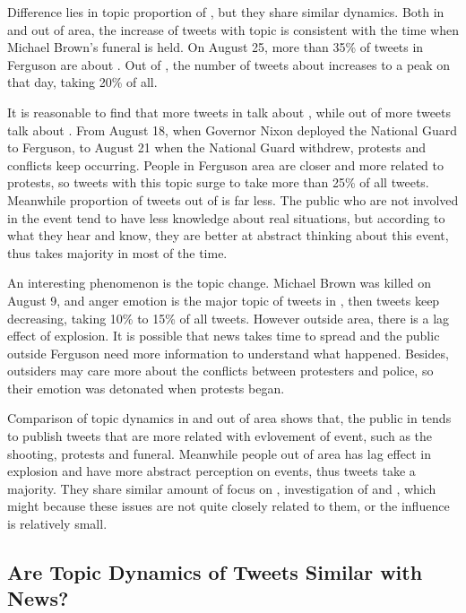 Difference lies in topic proportion of \pray, but they share similar dynamics. Both in and out of \stlouis area, the increase of tweets with \pray topic is consistent with the time when Michael Brown's funeral is held. On August 25, more than 35\% of tweets in Ferguson are about \pray. Out of \stlouis, the number of tweets about \pray increases to a peak on that day, taking 20\% of all.

It is reasonable to find that more tweets in \stlouis talk about \protest, while out of \stlouis more tweets talk about \racism. From August 18, when Governor Nixon deployed the National Guard to Ferguson, to August 21 when the National Guard withdrew, protests and conflicts keep occurring. People in Ferguson area are closer and more related to protests, so tweets with this topic surge to take more than 25\% of all tweets. Meanwhile proportion of \protest tweets out of \stlouis is far less. The public who are not involved in the event tend to have less knowledge about real situations, but according to what they hear and know, they are better at abstract thinking about this event, thus \racism takes majority in most of the time.

An interesting phenomenon is the \emotion topic change. Michael Brown was killed on August 9, and anger emotion is the major topic of tweets in \stlouis, then \emotion tweets keep decreasing, taking 10\% to 15\% of all tweets. However outside \stlouis area, there is a lag effect of \emotion explosion. It is possible that news takes time to spread and the public outside Ferguson need more information to understand what happened. Besides, outsiders may care more about the conflicts between protesters and police, so their emotion was detonated when protests began.

Comparison of topic dynamics in and out of \stlouis area shows that, the public in \stlouis tends to publish tweets that are more related with evlovement of event, such as the shooting, protests and funeral. Meanwhile people out of \stlouis area has lag effect in \emotion explosion and have more abstract perception on events, thus \racism tweets take a majority. They share similar amount of focus on \newsreport, investigation of \michaelbrown \shootincident and \curfew, which might because these issues are not quite closely related to them, or the influence is relatively small.

\subsection{Are Topic Dynamics of Tweets Similar with News?}

